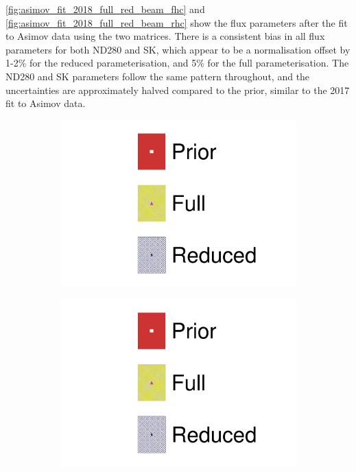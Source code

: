 \autoref{fig:asimov_fit_2018_full_red_beam_fhc} and \autoref{fig:asimov_fit_2018_full_red_beam_rhc} show the flux parameters after the fit to Asimov data using the two matrices. There is a consistent bias in all flux parameters for both ND280 and SK, which appear to be a normalisation offset by 1-2\% for the reduced parameterisation, and 5\% for the full parameterisation. The ND280 and SK parameters follow the same pattern throughout, and the uncertainties are approximately halved compared to the prior, similar to the 2017 fit to Asimov data.
\begin{figure}[h]
	\centering
\begin{subfigure}[t]{0.1\textwidth}
	\includegraphics[width=\textwidth,page=1, trim={0mm 135mm 30mm 0mm}, clip]{figures/mach3/2018/asimov/2018a_FixedCov_FullCov_Mpi_Asimov_merg_2018a_FixedCov_RedCov_Mpi_Asimov_merge}
\end{subfigure}
\begin{subfigure}[t]{0.1\textwidth}
	\includegraphics[width=\textwidth,page=1, trim={0mm 70mm 30mm 60mm}, clip]{figures/mach3/2018/asimov/2018a_FixedCov_FullCov_Mpi_Asimov_merg_2018a_FixedCov_RedCov_Mpi_Asimov_merge}

\end{subfigure}
\end{figure}
